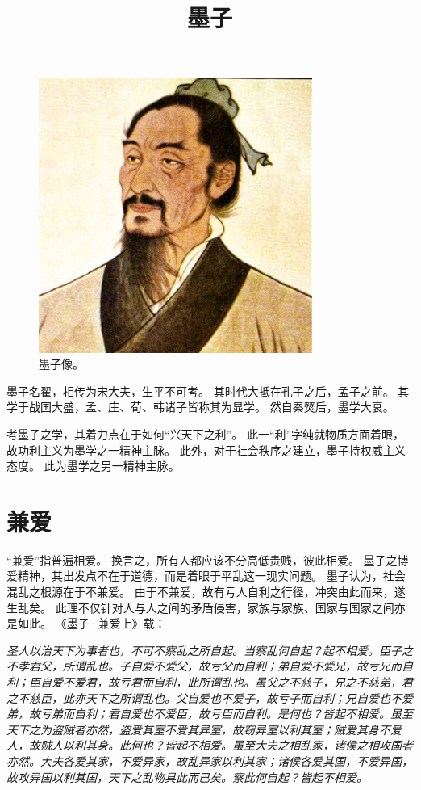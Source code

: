 \documentclass[11pt]{article}
\title{墨子}
\date{}
\begin{document}
  \maketitle
  
  \begin{figure}
    \centering
    \includegraphics[width=0.8\textwidth]{../Figures/MoZi.jpg}
    \caption{墨子像。}
  \end{figure}
  \newpage

  \linenumbers

墨子名翟，相传为宋大夫，生平不可考。
其时代大抵在孔子之后，孟子之前。
其学于战国大盛，孟、庄、荀、韩诸子皆称其为显学。
然自秦燹后，墨学大衰。

\newline

考墨子之学，其着力点在于如何“兴天下之利”。
此一“利”字纯就物质方面着眼，故功利主义为墨学之一精神主脉。
此外，对于社会秩序之建立，墨子持权威主义态度。
此为墨学之另一精神主脉。

\section{兼爱}
“兼爱”指普遍相爱。
换言之，所有人都应该不分高低贵贱，彼此相爱。
墨子之博爱精神，其出发点不在于道德，而是着眼于平乱这一现实问题。
墨子认为，社会混乱之根源在于不兼爱。
由于不兼爱，故有亏人自利之行径，冲突由此而来，遂生乱矣。
此理不仅针对人与人之间的矛盾侵害，家族与家族、国家与国家之间亦是如此。
《墨子·兼爱上》载：

\textit{圣人以治天下为事者也，不可不察乱之所自起。当察乱何自起？起不相爱。臣子之不孝君父，所谓乱也。子自爱不爱父，故亏父而自利；弟自爱不爱兄，故亏兄而自利；臣自爱不爱君，故亏君而自利，此所谓乱也。虽父之不慈子，兄之不慈弟，君之不慈臣，此亦天下之所谓乱也。父自爱也不爱子，故亏子而自利；兄自爱也不爱弟，故亏弟而自利；君自爱也不爱臣，故亏臣而自利。是何也？皆起不相爱。虽至天下之为盗贼者亦然，盗爱其室不爱其异室，故窃异室以利其室；贼爱其身不爱人，故贼人以利其身。此何也？皆起不相爱。虽至大夫之相乱家，诸侯之相攻国者亦然。大夫各爱其家，不爱异家，故乱异家以利其家；诸侯各爱其国，不爱异国，故攻异国以利其国，天下之乱物具此而已矣。察此何自起？皆起不相爱。}
\end{document}
